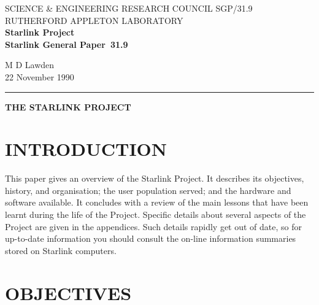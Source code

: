 \pagestyle{myheadings}

\newcommand{\stardoccategory}  {Starlink General Paper}
\newcommand{\stardocinitials}  {SGP}
\newcommand{\stardocnumber}    {31.9}
\newcommand{\stardocauthors}   {M D Lawden}
\newcommand{\stardocdate}      {22 November 1990}
\newcommand{\stardoctitle}     {THE STARLINK PROJECT}

\newcommand{\stardocname}{\stardocinitials /\stardocnumber}
\markright{\stardocname}
\setlength{\textwidth}{160mm}
\setlength{\textheight}{240mm}
\setlength{\topmargin}{-5mm}
\setlength{\oddsidemargin}{0mm}
\setlength{\evensidemargin}{0mm}
\setlength{\parindent}{0mm}
\setlength{\parskip}{\medskipamount}
\setlength{\unitlength}{1mm}


\thispagestyle{empty}
SCIENCE \& ENGINEERING RESEARCH COUNCIL \hfill \stardocname\\
RUTHERFORD APPLETON LABORATORY\\
{\large\bf Starlink Project\\}
{\large\bf \stardoccategory\ \stardocnumber}
\begin{flushright}
\stardocauthors\\
\stardocdate
\end{flushright}
\vspace{-4mm}
\rule{\textwidth}{0.5mm}
\vspace{5mm}
\begin{center}
{\Large\bf \stardoctitle}
\end{center}
\vspace{5mm}

\section {INTRODUCTION}

This paper gives an overview of the Starlink Project.
It describes its objectives, history, and organisation; the user
population served; and the hardware and software available.
It concludes with a review of the main lessons that have been learnt during
the life of the Project.
Specific details about several aspects of the Project are given in the
appendices.
Such details rapidly get out of date, so for up-to-date information you should
consult the on-line information summaries stored on Starlink computers.

\section {OBJECTIVES}

